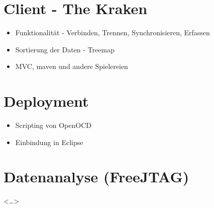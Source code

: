 \section{Client - The Kraken}
\begin{itemize}
  \item Funktionalität - Verbinden, Trennen, Synchronisieren, Erfassen
  \item Sortierung der Daten - Treemap
  \item MVC, maven und andere Spielereien
\end{itemize}
\section{Deployment}
\begin{itemize}
  \item Scripting von OpenOCD
  \item Einbindung in Eclipse
\end{itemize}
\section{Datenanalyse (FreeJTAG)}
<\ldots>